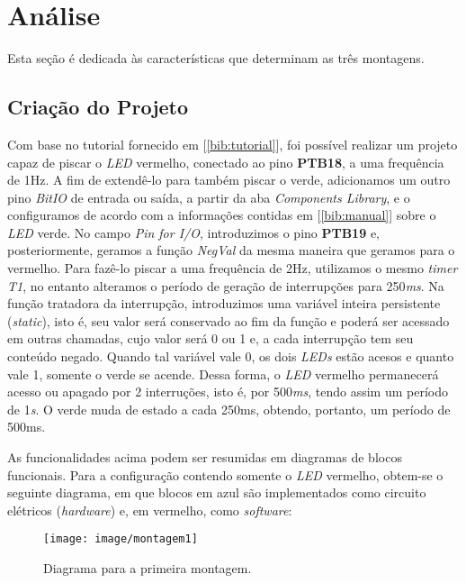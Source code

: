 \section {Análise}

Esta seção é dedicada às características que determinam as três montagens.

\subsection{Criação do Projeto}

Com base no tutorial fornecido em [\ref{bib:tutorial}], foi possível
realizar um projeto capaz de piscar o \textit{LED} vermelho, conectado ao pino
\textbf{PTB18}, a uma frequência de 1Hz. A fim de extendê-lo para também piscar
o verde, adicionamos um outro pino \textit {BitIO} de entrada ou saída, a partir
da aba \textit{Components Library}, e o configuramos de acordo com a informações
contidas em [\ref{bib:manual}] sobre o \textit{LED} verde. No campo \textit{Pin
for I/O}, introduzimos o pino \textbf{PTB19} e, posteriormente, geramos a função
\textit{NegVal} da mesma maneira que geramos para o vermelho. Para fazê-lo
piscar a uma frequência de 2Hz, utilizamos o mesmo \textit{timer} \textit{T1},
no entanto alteramos o período de geração de interrupções para 250\textit{ms}.
Na função tratadora da interrupção, introduzimos uma variável inteira
persistente (\textit{static}), isto é, seu valor será conservado ao fim da
função e poderá ser acessado em outras chamadas, cujo valor será 0 ou 1 e, a
cada interrupção tem seu conteúdo negado. Quando tal variável vale 0, os dois
\textit{LEDs} estão acesos e quanto vale 1, somente o verde se acende. Dessa
forma, o \textit{LED} vermelho permanecerá acesso ou apagado por 2 interruções,
isto é, por 500\textit{ms}, tendo assim um período de 1\textit{s}. O verde
muda de estado a cada 250ms, obtendo, portanto, um período de 500ms.

\vspace{12pt}

As funcionalidades acima podem ser resumidas em diagramas de blocos funcionais.
Para a configuração contendo somente o \textit{LED} vermelho, obtem-se o
seguinte diagrama, em que blocos em azul são implementados como circuito
elétricos (\textit{hardware}) e, em vermelho, como \textit{software}: 

\FloatBarrier

\begin{figure}[h]
    \centering
    \texttt{[image: image/montagem1]}
    
    \caption{Diagrama para a primeira montagem.}
    \label{fig:m1}
\end{figure} 


